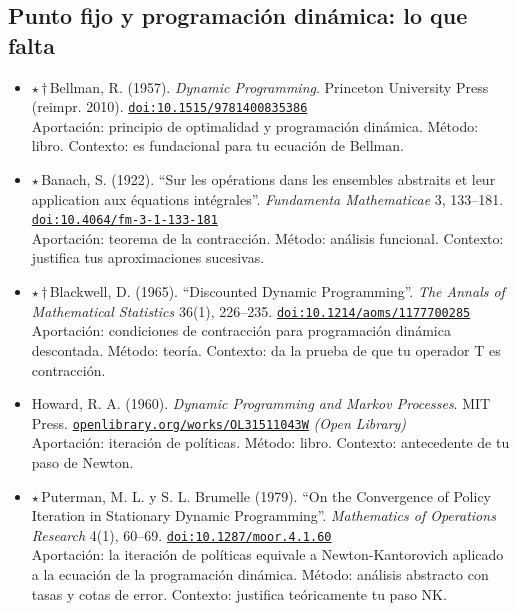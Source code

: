 \documentclass[11pt]{article}
\begin{document}
\subsection*{Punto fijo y programación dinámica: lo que falta}
\begin{itemize}
\item $\star$\,$\dagger$\,Bellman, R. (1957). \textit{Dynamic Programming}. Princeton University Press (reimpr. 2010). \href{https://doi.org/10.1515/9781400835386}{\texttt{doi:10.1515/9781400835386}}\\
Aportación: principio de optimalidad y programación dinámica. Método: libro. Contexto: es fundacional para tu ecuación de Bellman.
\item $\star$\,Banach, S. (1922). ``Sur les opérations dans les ensembles abstraits et leur application aux équations intégrales''. \textit{Fundamenta Mathematicae} 3, 133--181. \href{https://doi.org/10.4064/fm-3-1-133-181}{\texttt{doi:10.4064/fm-3-1-133-181}}\\
Aportación: teorema de la contracción. Método: análisis funcional. Contexto: justifica tus aproximaciones sucesivas.
\item $\star$\,$\dagger$\,Blackwell, D. (1965). ``Discounted Dynamic Programming''. \textit{The Annals of Mathematical Statistics} 36(1), 226--235. \href{https://doi.org/10.1214/aoms/1177700285}{\texttt{doi:10.1214/aoms/1177700285}}\\
Aportación: condiciones de contracción para programación dinámica descontada. Método: teoría. Contexto: da la prueba de que tu operador T es contracción.
\item Howard, R. A. (1960). \textit{Dynamic Programming and Markov Processes}. MIT Press. \href{https://openlibrary.org/works/OL31511043W}{\texttt{openlibrary.org/works/OL31511043W}} \textit{(Open Library)}\\
Aportación: iteración de políticas. Método: libro. Contexto: antecedente de tu paso de Newton.
\item $\star$\,Puterman, M. L. y S. L. Brumelle (1979). ``On the Convergence of Policy Iteration in Stationary Dynamic Programming''. \textit{Mathematics of Operations Research} 4(1), 60--69. \href{https://doi.org/10.1287/moor.4.1.60}{\texttt{doi:10.1287/moor.4.1.60}}\\
Aportación: la iteración de políticas equivale a Newton-Kantorovich aplicado a la ecuación de la programación dinámica. Método: análisis abstracto con tasas y cotas de error. Contexto: justifica teóricamente tu paso NK.

\end{itemize}
\end{document}
